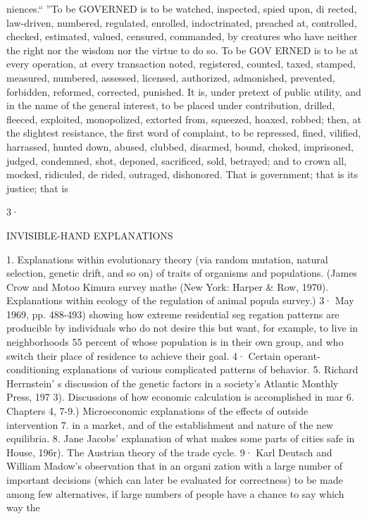 \documentclass[11pt,openany]{book}
\begin{document}
{\footnotesize\setlength{\parindent}{0pt}\setlength{\parskip}{5pt}

niences.`` ''To be GOVERNED is to be watched, inspected, spied upon, di rected, law-driven, numbered, regulated, enrolled, indoctrinated, preached at, controlled, checked, estimated, valued, censured, commanded, by creatures who have neither the right nor the wisdom nor the virtue to do so. To be GOV ERNED is to be at every operation, at every transaction noted, registered, counted, taxed, stamped, measured, numbered, assessed, licensed, authorized, admonished, prevented, forbidden, reformed, corrected, punished. It is, under pretext of public utility, and in the name of the general interest, to be placed under contribution, drilled, fleeced, exploited, monopolized, extorted from, squeezed, hoaxed, robbed; then, at the slightest resistance, the first word of complaint, to be repressed, fined, vilified, harrassed, hunted down, abused, clubbed, disarmed, bound, choked, imprisoned, judged, condemned, shot, deponed, sacrificed, sold, betrayed; and to crown all, mocked, ridiculed, de rided, outraged, dishonored. That is government; that is its justice; that is\par

3·\par

INVISIBLE-HAND EXPLANATIONS\par

1. Explanations within evolutionary theory (via random mutation, natural selection, genetic drift, and so on) of traits of organisms and populations. (James Crow and Motoo Kimura survey mathe (New York: Harper \& Row, 1970). Explanations within ecology of the regulation of animal popula survey.) 3· May 1969, pp. 488-493) showing how extreme residential seg regation patterns are producible by individuals who do not desire this but want, for example, to live in neighborhoods 55 percent of whose population is in their own group, and who switch their place of residence to achieve their goal. 4· Certain operant-conditioning explanations of various complicated patterns of behavior. 5. Richard Herrnstein' s discussion of the genetic factors in a society's Atlantic Monthly Press, 197 3). Discussions of how economic calculation is accomplished in mar 6. Chapters 4, 7-9.) Microeconomic explanations of the effects of outside intervention 7. in a market, and of the establishment and nature of the new equilibria. 8. Jane Jacobs' explanation of what makes some parts of cities safe in House, 196r). The Austrian theory of the trade cycle. 9· Karl Deutsch and William Madow's observation that in an organi zation with a large number of important decisions (which can later be evaluated for correctness) to be made among few alternatives, if large numbers of people have a chance to say which way the\par

}
\end{document}
